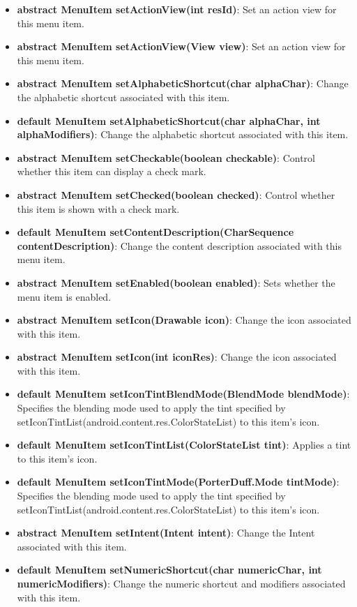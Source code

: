 \documentclass{report}
\begin{document}
\begin{itemize}
\begin{itemize}
\begin{itemize}
                \item \textbf{abstract MenuItem	setActionView(int resId)}: Set an action view for this menu item.
                \item \textbf{abstract MenuItem	setActionView(View view)}: Set an action view for this menu item.
                \item \textbf{abstract MenuItem	setAlphabeticShortcut(char alphaChar)}: Change the alphabetic shortcut associated with this item.
                \item \textbf{default MenuItem	setAlphabeticShortcut(char alphaChar, int alphaModifiers)}: Change the alphabetic shortcut associated with this item.
                \item \textbf{abstract MenuItem	setCheckable(boolean checkable)}: Control whether this item can display a check mark.
                \item \textbf{abstract MenuItem	setChecked(boolean checked)}: Control whether this item is shown with a check mark.
                \item \textbf{default MenuItem	setContentDescription(CharSequence contentDescription)}: Change the content description associated with this menu item.
                \item \textbf{abstract MenuItem	setEnabled(boolean enabled)}: Sets whether the menu item is enabled.
                \item \textbf{abstract MenuItem	setIcon(Drawable icon)}: Change the icon associated with this item.
                \item \textbf{abstract MenuItem	setIcon(int iconRes)}: Change the icon associated with this item.
                \item \textbf{default MenuItem	setIconTintBlendMode(BlendMode blendMode)}: Specifies the blending mode used to apply the tint specified by setIconTintList(android.content.res.ColorStateList) to this item's icon.
                \item \textbf{default MenuItem	setIconTintList(ColorStateList tint)}: Applies a tint to this item's icon.
                \item \textbf{default MenuItem	setIconTintMode(PorterDuff.Mode tintMode)}: Specifies the blending mode used to apply the tint specified by setIconTintList(android.content.res.ColorStateList) to this item's icon.
                \item \textbf{abstract MenuItem	setIntent(Intent intent)}: Change the Intent associated with this item.
                \item \textbf{default MenuItem	setNumericShortcut(char numericChar, int numericModifiers)}: Change the numeric shortcut and modifiers associated with this item.

\end{itemize}
\end{itemize}
\end{itemize}
\end{document}
